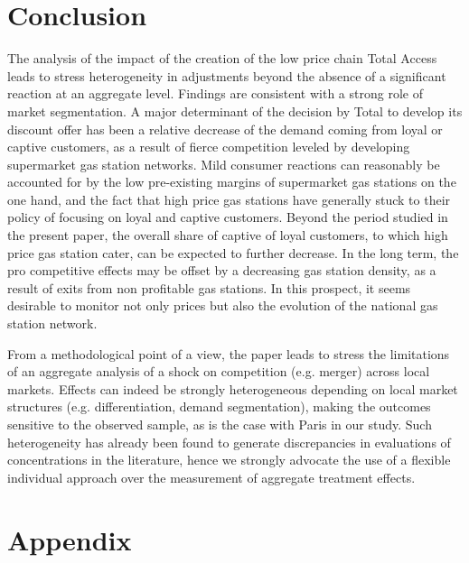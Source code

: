 \documentclass[english]{article}
\begin{document}
\section{Conclusion}

The analysis of the impact of the creation of the low price chain Total Access leads to stress heterogeneity in adjustments beyond the absence of a significant reaction at an aggregate level. Findings are consistent with a strong role of market segmentation. A major determinant of the decision by Total to develop its discount offer has been a relative decrease of the demand coming from loyal or captive customers, as a result of fierce competition leveled by developing supermarket gas station networks. Mild consumer reactions can reasonably be accounted for by the low pre-existing margins of supermarket gas stations on the one hand, and the fact that high price gas stations have generally stuck to their policy of focusing on loyal and captive customers.
Beyond the period studied in the present paper, the overall share of captive of loyal customers, to which high price gas station cater, can be expected to further decrease. In the long term, the pro competitive effects may be offset by a decreasing gas station density, as a result of exits from non profitable gas stations. In this prospect, it seems desirable to monitor not only prices but also the evolution of the national gas station network.\medskip{}

From a methodological point of a view, the paper leads to stress the limitations of an aggregate analysis of a shock on competition (e.g. merger) across local markets. Effects can indeed be strongly heterogeneous depending on local market structures (e.g. differentiation, demand segmentation), making the outcomes sensitive to the observed sample, as is the case with Paris in our study. Such heterogeneity has already been found to generate discrepancies in evaluations of concentrations in the literature, hence we strongly advocate the use of a flexible individual approach over the measurement of aggregate treatment effects.

\newpage



\newpage

\appendix

\section{Appendix}
\end{document}
